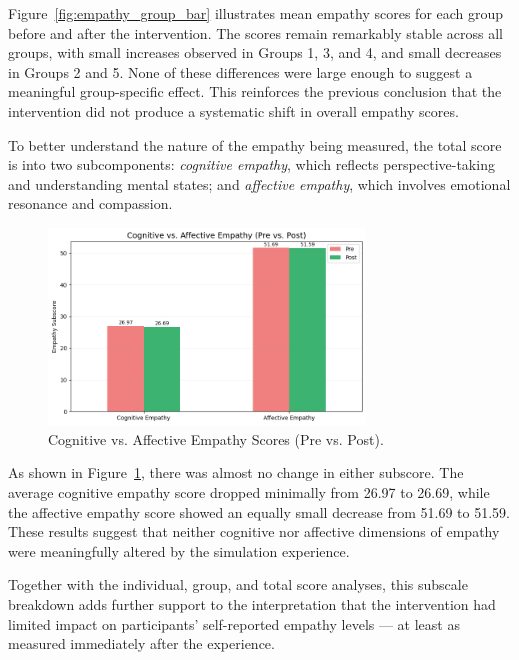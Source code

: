 Figure~\ref{fig:empathy_group_bar} illustrates mean empathy scores for each group before and after the intervention. The scores remain remarkably stable across all groups, with small increases observed in Groups 1, 3, and 4, and small decreases in Groups 2 and 5. None of these differences were large enough to suggest a meaningful group-specific effect. This reinforces the previous conclusion that the intervention did not produce a systematic shift in overall empathy scores.

\vspace{1em}

To better understand the nature of the empathy being measured, the total score is into two subcomponents: \textit{cognitive empathy}, which reflects perspective-taking and understanding mental states; and \textit{affective empathy}, which involves emotional resonance and compassion.

\begin{figure}[htbp]
    \centering
    \includegraphics[width=0.75\textwidth]{../../Figures/cog-vs-affect.png}
    \caption{Cognitive vs. Affective Empathy Scores (Pre vs. Post).}
    \label{fig:empathy_cog_aff}
\end{figure}

As shown in Figure~\ref{fig:empathy_cog_aff}, there was almost no change in either subscore. The average cognitive empathy score dropped minimally from 26.97 to 26.69, while the affective empathy score showed an equally small decrease from 51.69 to 51.59. These results suggest that neither cognitive nor affective dimensions of empathy were meaningfully altered by the simulation experience.

Together with the individual, group, and total score analyses, this subscale breakdown adds further support to the interpretation that the intervention had limited impact on participants' self-reported empathy levels — at least as measured immediately after the experience.

